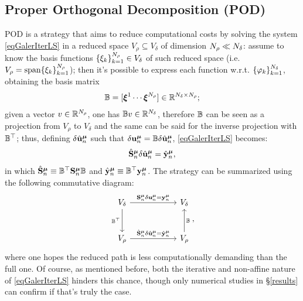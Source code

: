 \documentclass[
    conference,
    nofonttune,
    11pt
]{IEEEtran}
\begin{document}
        \subsection{Proper Orthogonal Decomposition (POD)}\label{secPOD}

            POD is a strategy that aims to reduce computational costs by solving the system \eqref{eqGalerIterLS} in a reduced space $V_\rho\subseteq V_\delta$ of dimension ${N_\rho}\ll{N_\delta}$: assume to know the basis functions $\{\xi_k\}_{k=1}^{N_\rho}\in V_\delta$ of such reduced space (i.e. $V_\rho=\operatorname{span}\{\xi_k\}_{k=1}^{N_\rho}$); then it's possible to express each function w.r.t. $\{\varphi_k\}_{k=1}^{N_\delta}$, obtaining the basis matrix 
            $$
                {\mathbb B}=[{\boldsymbol\xi}^1\cdots{\boldsymbol\xi}^{N_\rho}]\in{\mathbb R}^{{N_\delta}\times{N_\rho}};
            $$
            given a vector $v\in{\mathbb R}^{N_\rho}$, one has ${\mathbb B} v\in{\mathbb R}^{N_\delta}$, therefore ${\mathbb B}$ can be seen as a projection from $V_\rho$ to $V_\delta$ and the same can be said for the inverse projection with ${\mathbb B}^\top$; thus, defining $\delta\hat{{\mathbf u}}^{\boldsymbol\mu}_n$ such that $\delta{\mathbf u}^{\boldsymbol\mu}_n={\mathbb B}\delta\hat{{\mathbf u}}^{\boldsymbol\mu}_n$, \eqref{eqGalerIterLS} becomes:
            \begin{equation}
                \label{eqReducedGalerIterLS}
                \hat{\mBF S}^\boldmu_n\delta\hat{\mBF u}^\boldmu_n
                =\hat{\mBF y}^\boldmu_n,
            \end{equation}
            in which $\hat{{\mathbf S}}^{\boldsymbol\mu}_n\equiv{\mathbb B}^\top{\mathbf S}^{\boldsymbol\mu}_n{\mathbb B}$ and $\hat{{\mathbf y}}^{\boldsymbol\mu}_n\equiv{\mathbb B}^\top{\mathbf y}^{\boldsymbol\mu}_n$. The strategy can be summarized using the following commutative diagram: 
            $$
                \begin{tikzcd}[
                    row sep=1cm,
                    column sep=2cm,
                ]
                    V_\delta
                    \arrow[r,"\mBF S^\boldmu_n\delta\mBF u^\boldmu_n=\mBF y^\boldmu_n"] 
                    \arrow[d,"\ReducedBase^\top"']&
                    V_\delta\arrow[d,"\ReducedBase",leftarrow]\\
                    V_\rho
                    \arrow[r,"\hat{\mBF S}^\boldmu_n\delta\hat{\mBF u}^\boldmu_n=\hat{\mBF y}^\boldmu_n"]&
                    V_\rho
                \end{tikzcd},
            $$
            where one hopes the reduced path is less computationally demanding than the full one. Of course, as mentioned before, both the iterative and non-affine nature of \eqref{eqGalerIterLS} hinders this chance, though only numerical studies in \S{\ref{results}}  can confirm if that's truly the case.
\end{document}
